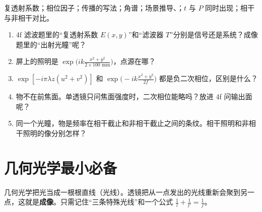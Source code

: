 \psee 复透射系数\pageref{sec:screens}；相位因子\pageref{sec:phasefactors}；传播的写法\pageref{sec:propforms}；角谱\pageref{sec:angspec}；场景推导\pageref{sec:lensFT}、\pageref{sec:sphericalillum}；$t$ 与 $P$ 同时出现\pageref{sec:tandP}；相干与非相干对比\pageref{sec:cohcompare}。

\begin{enumerate}[label=\arabic*.]
\item 4f 滤波题里的“复透射系数 $E(x,y)$”和“滤波器 $T$”分别是信号还是系统？成像题里的“出射光瞳”呢？
\item 屏上的照明是 $\exp\!\big(ik\frac{x^2+y^2}{2\times100\text{ mm}}\big)$，点源在哪？
\item $\exp[-i\pi\lambda z(u^2+v^2)]$ 和 $\exp\!\big(-ik\frac{x^2+y^2}{2f}\big)$ 都是负二次相位，区别是什么？
\item 物不在前焦面。单透镜只问焦面强度时，二次相位能略吗？放进 4f 问输出面呢？
\item 同一个光瞳，物是频率在相干截止和非相干截止之间的条纹。相干照明和非相干照明的像分别怎样？
\end{enumerate}

\section{几何光学最小必备}\label{sec:p-geom}

\begin{idea}[一句话]
几何光学把光当成一根根直线（光线）。透镜把从一点发出的光线重新会聚到另一点，这就是\textbf{成像}。只需记住“三条特殊光线”和一个公式 $\frac1l+\frac1{l'}=\frac1f$。
\end{idea}

